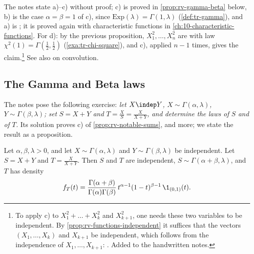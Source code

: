 The notes state a)--c) without proof; c) is proved in \cref{prop:rv-gamma-beta} below, b) is the
case $\alpha=\beta=1$ of c), since $\mathrm{Exp}(\lambda)=\Gamma(1,\lambda)$ (\cref{def:tr-gamma}),
and a) is ; it is proved again with characteristic functions in
\cref{ch:10-characteristic-functions}. For d): by the previous proposition,
$X_1^2,\dots,X_n^2$ are \iid with law $\chi^2(1)=\Gamma(\frac12,\frac12)$ (\cref{exa:tr-chi-square}),
and c), applied $n-1$ times, gives the claim.\footnote{To apply c) to $X_1^2+\dots+X_k^2$ and
$X_{k+1}^2$, one needs these two variables to be independent. By
\cref{prop:rv-functions-independent} it suffices that the vectors $(X_1,\dots,X_k)$ and $X_{k+1}$ be
independent, which follows from the independence of $X_1,\dots,X_{k+1}$: .
Added to the handwritten notes.} See also \citet[Section~20]{billingsley} on convolution.

\subsection{The Gamma and Beta laws}\label{sec:rv-gamma-beta}

The notes pose the following exercise: \emph{let $X\indep Y$, $X\sim\Gamma(\alpha,\lambda)$,
$Y\sim\Gamma(\beta,\lambda)$; set $S=X+Y$ and $T=\frac XS=\frac X{X+Y}$, and determine the laws of
$S$ and of $T$.} Its solution proves c) of \cref{prop:rv-notable-sums}, and more; we state the
result as a proposition.

\begin{proposition}\label{prop:rv-gamma-beta}
Let $\alpha,\beta,\lambda>0$, and let $X\sim\Gamma(\alpha,\lambda)$ and $Y\sim\Gamma(\beta,\lambda)$
be independent. Let $S=X+Y$ and $T=\frac X{X+Y}$. Then $S$ and $T$ are independent,
$S\sim\Gamma(\alpha+\beta,\lambda)$, and $T$ has density
\[
  f_T(t)=\frac{\Gamma(\alpha+\beta)}{\Gamma(\alpha)\Gamma(\beta)}\,t^{\alpha-1}(1-t)^{\beta-1}\,\1_{(0,1)}(t).
\]
\end{proposition}

